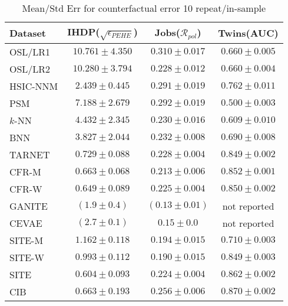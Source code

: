 \documentclass{article}
\begin{document}
\begin{table}[ht]
  \caption{Mean/Std Err for counterfactual error 10 repeat/in-sample}
  \label{metric-in_full}
  \centering
  \begin{tabular}{lccc}
    \toprule
    Dataset & IHDP($\sqrt{\epsilon_{PEHE}}$) & Jobs($\mathcal{R}_{pol}$) & Twins(AUC) \\
    \midrule
    OSL/LR1 & $10.761 \pm 4.350$ & $0.310 \pm 0.017$ & $0.660 \pm 0.005$ \\
    OSL/LR2 & $10.280 \pm 3.794$ & $0.228 \pm 0.012$ & $0.660 \pm 0.004$ \\
    \midrule
    HSIC-NNM & $2.439 \pm 0.445$ & $0.291 \pm 0.019$ & $0.762 \pm 0.011$ \\
    PSM & $7.188 \pm 2.679$ & $0.292 \pm 0.019$ & $0.500 \pm 0.003$ \\
    $k$-NN & $4.432 \pm 2.345$ & $0.230 \pm 0.016$ & $0.609 \pm 0.010$ \\
    \midrule
    BNN & $3.827 \pm 2.044$ & $0.232 \pm 0.008$ & $0.690 \pm 0.008$ \\
    TARNET & $\mathbf{0.729 \pm 0.088}$ & $0.228 \pm 0.004$ & $0.849 \pm 0.002$ \\
    CFR-M & $\mathbf{0.663 \pm 0.068}$ & $0.213 \pm 0.006$ & $0.852 \pm 0.001$ \\
    CFR-W & $\mathbf{0.649 \pm 0.089}$ & $0.225 \pm 0.004$ & $0.850 \pm 0.002$ \\
    GANITE & $(1.9 \pm 0.4)$ & $({0.13 \pm 0.01})$ & not reported\\
    CEVAE & $(2.7 \pm 0.1)$ & $\mathbf{0.15 \pm 0.0}$ & not reported\\
    SITE-M & $1.162 \pm 0.118$ & $0.194 \pm 0.015$ & $0.710 \pm 0.003$ \\
    SITE-W & $0.993 \pm 0.112$ & $0.190 \pm 0.015$ & $0.849 \pm 0.003$ \\
    SITE & $\mathbf{0.604 \pm 0.093}$ & $0.224 \pm 0.004$ & $0.862 \pm 0.002 $\\
    \midrule
    CIB & $ \mathbf{0.663 \pm 0.193}$ & $0.256 \pm 0.006$ & $\mathbf{0.870 \pm 0.002}$ \\
    \bottomrule
  \end{tabular}
\end{table}
\end{document}
